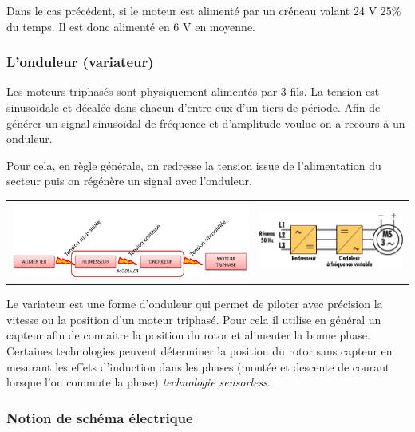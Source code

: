 Dans le cas précédent, si le moteur est alimenté par un créneau valant
24 V 25\% du temps. Il est donc alimenté en 6 V en moyenne.


\subsubsection{L'onduleur (variateur)}

Les moteurs triphasés sont physiquement alimentés par 3 fils. La tension
est sinusoïdale et décalée dans chacun d'entre eux d'un tiers de
période. Afin de générer un signal sinusoïdal de fréquence et
d'amplitude voulue on a recours à un onduleur.

Pour cela, en règle générale, on redresse la tension issue de
l'alimentation du secteur puis on régénère un signal avec l'onduleur.

\begin{tabular}{cc}
\includegraphics[width=3.95349in,height=0.98369in]{media/image107.png} &
\includegraphics[width=2.39535in,height=0.89582in]{media/image108.png} \\
\end{tabular}

Le variateur est une forme d'onduleur qui permet de piloter avec
précision la vitesse ou la position d'un moteur triphasé. Pour cela il
utilise en général un capteur afin de connaitre la position du rotor et
alimenter la bonne phase. Certaines technologies peuvent déterminer la
position du rotor sans capteur en mesurant les effets d'induction dans
les phases (montée et descente de courant lorsque l'on commute la phase)
\emph{technologie sensorless}.


\subsubsection{Notion de schéma électrique}

